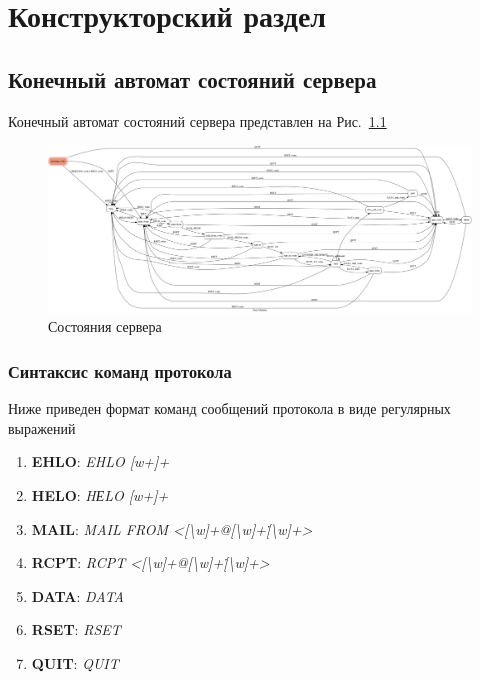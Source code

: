 \documentclass[a4paper,12pt]{report}
\begin{document}
\chapter{Конструкторский раздел}

\section{Конечный автомат состояний сервера}

Конечный автомат состояний сервера представлен на Рис.~\ref{fig:server_fsm} 

\begin{figure}
	\centering
	\includegraphics[width=\textwidth]{static/server_dot.png}
	\caption{Состояния сервера}
	\label{fig:server_fsm}
\end{figure}

\subsection{Синтаксис команд протокола}
Ниже приведен формат команд сообщений протокола в виде регулярных выражений
\begin{enumerate}
\item \textbf{EHLO}: {\it EHLO [w+]+\/}
\item \textbf{HELO}: {\it HЕLO [w+]+\/}
\item \textbf{MAIL}: {\it MAIL FROM <[\textbackslash w]+@[\textbackslash w]+\.[\textbackslash w]+>\/}
\item \textbf{RCPT}: {\it RCPT <[\textbackslash w]+@[\textbackslash w]+\.[\textbackslash w]+>\/}
\item \textbf{DATA}: {\it DATA\/}
\item \textbf{RSET}: {\it RSET\/}
\item \textbf{QUIT}: {\it QUIT\/}
\end{enumerate}
\end{document}
